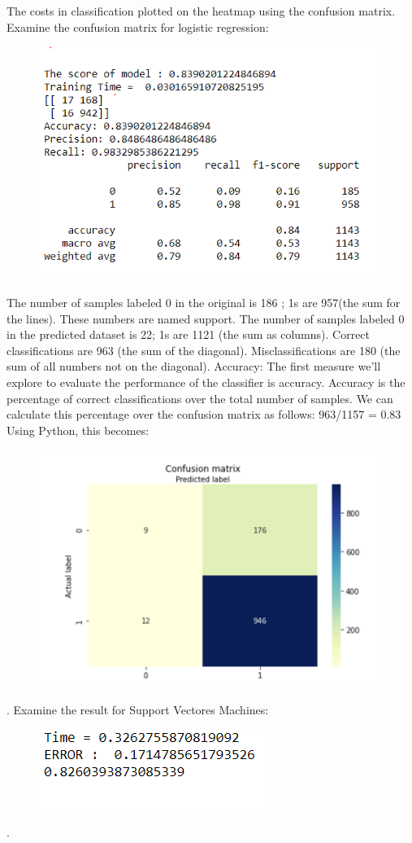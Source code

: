 \documentclass[onecolumn]{article}
\begin{document}
The costs in classification plotted on the heatmap using the confusion matrix. 
Examine the confusion matrix for logistic regression:
\begin{figure}[h!t]
\centering
    \includegraphics[width=.6\linewidth]{fig/log_regression.PNG}
\caption{\label{fig:dataset}
}
\end{figure}
The number of samples labeled 0 in the original is 186 ; 1s are 957(the sum for the lines). These numbers are named support.
The number of samples labeled 0 in the predicted dataset is 22; 1s are 1121 (the sum as columns).
Correct classifications are 963 (the sum of the diagonal).
Misclassifications are 180 (the sum of all numbers not on the diagonal).
Accuracy: The first measure we'll explore to evaluate the performance of the classifier is accuracy. Accuracy is the percentage of correct classifications over the total number of samples.
We can calculate this percentage over the confusion matrix as follows:
963/1157 = 0.83
Using Python, this becomes:
\begin{figure}[h!t]
\centering
    \includegraphics[width=.5\linewidth]{fig/heatmap.png}
\caption{\label{fig:dataset}
}
\end{figure}.
Examine the result for Support Vectores Machines:
\begin{figure}[h!t]
\centering
    \includegraphics[width=.5\linewidth]{fig/svc.PNG}
\caption{\label{fig:dataset}
}
\end{figure}.
\end{document}
